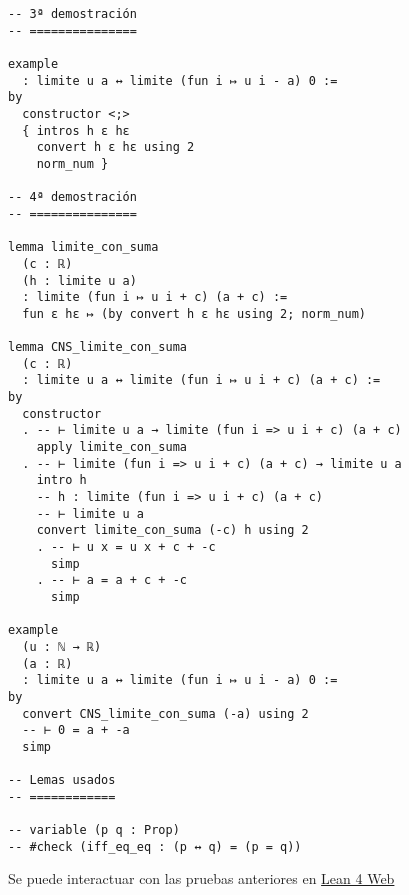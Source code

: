 \begin{verbatim}
-- 3ª demostración
-- ===============

example
  : limite u a ↔ limite (fun i ↦ u i - a) 0 :=
by
  constructor <;>
  { intros h ε hε
    convert h ε hε using 2
    norm_num }

-- 4ª demostración
-- ===============

lemma limite_con_suma
  (c : ℝ)
  (h : limite u a)
  : limite (fun i ↦ u i + c) (a + c) :=
  fun ε hε ↦ (by convert h ε hε using 2; norm_num)

lemma CNS_limite_con_suma
  (c : ℝ)
  : limite u a ↔ limite (fun i ↦ u i + c) (a + c) :=
by
  constructor
  . -- ⊢ limite u a → limite (fun i => u i + c) (a + c)
    apply limite_con_suma
  . -- ⊢ limite (fun i => u i + c) (a + c) → limite u a
    intro h
    -- h : limite (fun i => u i + c) (a + c)
    -- ⊢ limite u a
    convert limite_con_suma (-c) h using 2
    . -- ⊢ u x = u x + c + -c
      simp
    . -- ⊢ a = a + c + -c
      simp

example
  (u : ℕ → ℝ)
  (a : ℝ)
  : limite u a ↔ limite (fun i ↦ u i - a) 0 :=
by
  convert CNS_limite_con_suma (-a) using 2
  -- ⊢ 0 = a + -a
  simp

-- Lemas usados
-- ============

-- variable (p q : Prop)
-- #check (iff_eq_eq : (p ↔ q) = (p = q))
\end{verbatim}
Se puede interactuar con las pruebas anteriores en \href{https://lean.math.hhu.de/\#url=https://raw.githubusercontent.com/jaalonso/Calculemus2/main/src/El\_limite\_de\_u\_es\_a\_syss\_el\_de\_u-a\_es\_0.lean}{Lean 4 Web}

